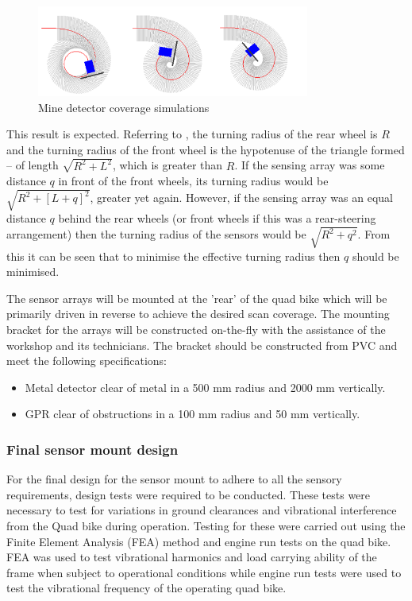 \documentclass[main.tex]{subfiles}
\begin{document}
\begin{figure}[ht]
\includegraphics[width=0.8\textwidth]{4-DetailedDesign/Detector_Coverage.png}
\centering
\caption{Mine detector coverage simulations} 
\end{figure}
This result is expected. Referring to , the turning radius of the rear wheel is $R$ and the turning radius of the front wheel is the hypotenuse of the triangle formed – of length $\sqrt{R^2 + L^2}$, which is greater than $R$. If the sensing array was some distance $q$ in front of the front wheels, its turning radius would be $\sqrt{R^2 + [L+q]^2}$, greater yet again. However, if the sensing array was an equal distance $q$ behind the rear wheels (or front wheels if this was a rear-steering arrangement) then the turning radius of the sensors would be $\sqrt{R^2 + q^2}$. From this it can be seen that to minimise the effective turning radius then $q$ should be minimised.

The sensor arrays will be mounted at the 'rear' of the quad bike which will be primarily driven in reverse to achieve the desired scan coverage. The mounting bracket for the arrays will be constructed on-the-fly with the assistance of the workshop and its technicians. The bracket should be constructed from PVC and meet the following specifications:
\begin{itemize}
\item Metal detector clear of metal in a 500 mm radius and 2000 mm vertically.
\item GPR clear of obstructions in a 100 mm radius and 50 mm vertically.
\end{itemize}

\subsubsection{Final sensor mount design}
For the final design for the sensor mount to adhere to all the sensory requirements, design tests were required to be conducted. These tests were necessary to test for variations in ground clearances and vibrational interference from the Quad bike during operation. Testing for these were carried out using the Finite Element Analysis (FEA) method and engine run tests on the quad bike. FEA was used to test vibrational harmonics and load carrying ability of the frame when subject to operational conditions while engine run tests were used to test the vibrational frequency of the operating quad bike. 
\end{document}
